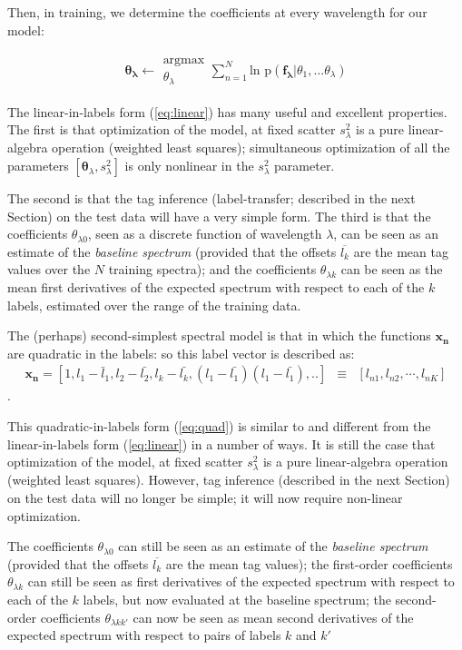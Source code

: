 \documentclass[12pt, preprint]{aastex}
\newcommand{\set}[1]{\bm{#1}}
\newcommand{\mean}[1]{\overline{#1}}
\begin{document}
Then, in training, we determine the coefficients at every wavelength for our model:

\begin{eqnarray}
\set{\theta_\lambda} \leftarrow \substack{\mbox{argmax}\\
{\theta_\lambda}  }
\sum_{n=1}^N \mbox{ln p}(\set{f_\lambda} | {\theta_1,...\theta_\lambda})
\end{eqnarray}

The linear-in-labels form (\ref{eq:linear}) has many useful and
excellent properties.
The first is that optimization of the model, at fixed scatter
$s_\lambda^2$ is a pure linear-algebra operation (weighted least
squares); simultaneous optimization of all the parameters
$[\set{\theta}_\lambda,s_\lambda^2]$ is only nonlinear in the $s_\lambda^2$
parameter.

%
The second is that the tag inference (label-transfer; described in the
next Section) on the test data will have a very simple form.
The third is that the coefficients $\theta_{\lambda 0}$, seen as a discrete
function of wavelength $\lambda$, can be seen as an estimate of
the \emph{baseline spectrum} (provided that the offsets $\mean{l_k}$ are
the mean tag values over the $N$ training spectra); and the
coefficients $\theta_{\lambda k}$ can be seen as the mean first derivatives of
the expected spectrum with respect to each of the $k$ labels, estimated
over the range of the training data.

The (perhaps) second-simplest spectral model is that in which the
functions $\set{x_n}$ are quadratic in the labels: so this label vector is described as:
\begin{eqnarray}
\set{x_n} =  [1, l_1 - \bar{l}_1, l_2 - \bar{l_2}, l_k - \bar{l_k}, (l_1 - \bar{l_1})(l_1 - \bar{l_1}), .. ] &\equiv& [l_{n1}, l_{n2}, \cdots, l_{nK}]
\label{eq:quad}
\end{eqnarray}.

This quadratic-in-labels form (\ref{eq:quad}) is similar to and
different from the linear-in-labels form (\ref{eq:linear}) in a number
of ways.
It is still the case that optimization of the model, at fixed scatter
$s_\lambda^2$ is a pure linear-algebra operation (weighted least
squares).
However, tag inference (described in the next Section) on the test
data will no longer be simple; it will now require non-linear
optimization.

The coefficients $\theta_{\lambda 0}$ can still be seen as an estimate of the
\emph{baseline spectrum} (provided that the offsets $\mean{l_k}$ are the
mean tag values); the first-order coefficients $\theta_{\lambda k}$ can still
be seen as first derivatives of the expected spectrum with respect to
each of the $k$ labels, but now evaluated at the baseline spectrum; the
second-order coefficients $\theta_{\lambda kk'}$ can now be seen as mean
second derivatives of the expected spectrum with respect to pairs of
labels $k$ and $k'$
\end{document}
